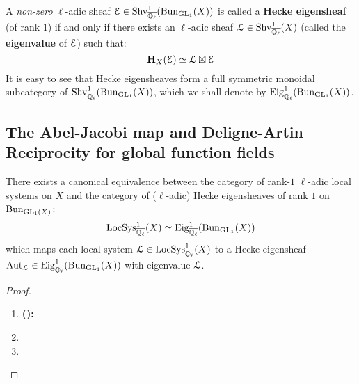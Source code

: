         \begin{definition} \label{def: hecke_eigensheaves}
            A \textit{non-zero} $\ell$-adic sheaf $\mathcal{E} \in \mathrm{Shv}_{\overline{\mathbb{Q}_{\ell}}}^1(\mathrm{Bun}_{\operatorname{GL}_1}(X))$ is called a \textbf{Hecke eigensheaf} (of rank $1$) if and only if there exists an $\ell$-adic sheaf $\mathcal{L} \in \mathrm{Shv}_{\overline{\mathbb{Q}_{\ell}}}^1(X)$ (called the \textbf{eigenvalue} of $\mathcal{E}$) such that:
                $$\mathbf{H}_X(\mathcal{E}) \simeq \mathcal{L} \boxtimes \mathcal{E}$$
            It is easy to see that Hecke eigensheaves form a full symmetric monoidal subcategory of $\mathrm{Shv}_{\overline{\mathbb{Q}_{\ell}}}^1(\mathrm{Bun}_{\operatorname{GL}_1}(X))$, which we shall denote by $\mathrm{Eig}^1_{\overline{\mathbb{Q}_{\ell}}}(\mathrm{Bun}_{\operatorname{GL}_1}(X))$.
        \end{definition}
    
    \subsection{The Abel-Jacobi map and Deligne-Artin Reciprocity for global function fields}
        \begin{theorem} \label{theorem: unramified_abelian_geometric_class_field_theory}
            There exists a canonical equivalence between the category of rank-$1$ $\ell$-adic local systems on $X$ and the category of ($\ell$-adic) Hecke eigensheaves of rank $1$ on $\mathrm{Bun}_{\operatorname{GL}_1(X)}$:
                $$\mathrm{LocSys}_{\overline{\mathbb{Q}_{\ell}}}^1(X) \simeq \mathrm{Eig}^1_{\overline{\mathbb{Q}_{\ell}}}(\mathrm{Bun}_{\operatorname{GL}_1}(X))$$
            which maps each local system $\mathcal{L} \in \mathrm{LocSys}_{\overline{\mathbb{Q}_{\ell}}}^1(X)$ to a Hecke eigensheaf $\mathrm{Aut}_{\mathcal{L}} \in \mathrm{Eig}^1_{\overline{\mathbb{Q}_{\ell}}}(\mathrm{Bun}_{\operatorname{GL}_1}(X))$ with eigenvalue $\mathcal{L}$.
        \end{theorem}
            \begin{proof}
                \noindent
                \begin{enumerate}
                    \item \textbf{():}
                    \item
                    \item 
                \end{enumerate}
            \end{proof}
